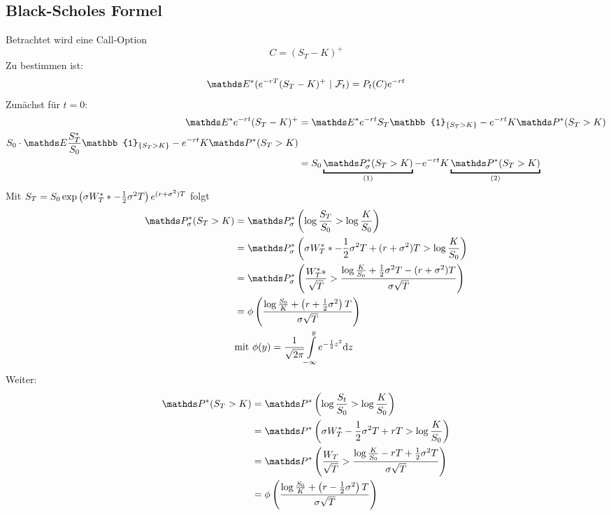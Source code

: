 \subsection{Black-Scholes Formel}
\label{sub:black_scholes_formel}
Betrachtet wird eine Call-Option
\[
C=(S_T-K)^+
\]
Zu bestimmen ist:
\[
\E^*(e^{-rT}(S_T-K)^+~|~\F_t)=P_t(C)e^{-rt}
\]
Zunächst für $t=0$:
\begin{equation*}
\begin{aligned}
	\E^*e^{-rt}(S_T-K)^+ &= \E^*e^{-rt}S_T\mathbb{1}_{\penbrace{S_T>K}}-e^{-rt}K\Pw^*(S_T>K)\\
	S_0\cdot \E\frac{S_T^*}{S_0}\mathbb{1}_{\penbrace{S_T>K}}-e^{-rt}K\Pw^*(S_T>K)\\
	&= S_0\underbracket{\Pw_\sigma^*(S_T>K)}_{(1)}-e^{-rt}K\underbracket{\Pw^*(S_T>K)}_{(2)}\\
\end{aligned}
\end{equation*}
Mit $S_T=S_0\exp\left( \sigma W_T^**-\frac{1}{2}\sigma^2 T\right)e^{(r+\sigma^2)T}$ folgt
\begin{equation*}
\begin{aligned}
	\Pw_\sigma^*(S_T>K) &= \Pw_\sigma^*\enbrace{\log\frac{S_T}{S_0}>\log\frac{K}{S_0}}\\
	&= \Pw_\sigma^*\enbrace{\sigma W_T^**-\frac{1}{2}\sigma^2 T+(r+\sigma^2)T>\log\frac{K}{S_0}}\\
	&= \Pw_\sigma^*\enbrace{\frac{W_T^**}{\sqrt{T}}>\frac{\log\frac{K}{S_0}+\frac{1}{2}\sigma^2T-(r+\sigma^2)T}{\sigma\sqrt{T}}}\\
	&= \phi\enbrace{\frac{\log\frac{S_0}{K}+\enbrace{r+\frac{1}{2}\sigma^2}T}{\sigma\sqrt{T}}}\\
	&\text{mit } \phi(y)=\frac{1}{\sqrt{2\pi}}\int\ablim{-\infty}^ye^{-\frac{1}{2}z^2}\dint z
\end{aligned}
\end{equation*}
Weiter:
\begin{equation*}
\begin{aligned}
	\Pw^*(S_T>K) &= \Pw^*\enbrace{\log\frac{S_t}{S_0}>\log\frac{K}{S_0}}\\
	&= \Pw^*\enbrace{\sigma W_T^*-\frac{1}{2}\sigma^2T+rT>\log\frac{K}{S_0}}\\
	&= \Pw^*\enbrace{\frac{W_T}{\sqrt{T}}>\frac{\log\frac{K}{S_0}-rT+\frac{1}{2}\sigma^2T}{\sigma\sqrt{T}}}\\
	&= \phi\enbrace{\frac{\log\frac{S_0}{K}+\enbrace{r-\frac{1}{2}\sigma^2}T}{\sigma\sqrt{T}}}
\end{aligned}
\end{equation*}

